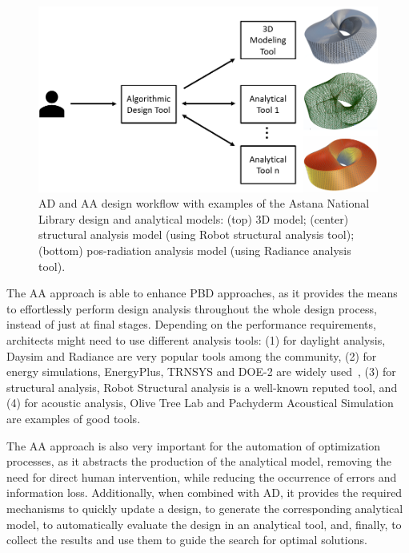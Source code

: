 \begin{figure}[htbp]
\centering
\includegraphics[width=1\textwidth]{./Images/Introduction/AlgorithmicDesignAndAnalysis_w_models2.png}
\caption[General view of the Algorithmic Design and Analysis approach]{\ac{AD} and \ac{AA} design workflow with examples of the Astana National Library design and analytical models: (top) 3D model; (center) structural analysis model (using Robot structural analysis tool); (bottom) pos-radiation analysis model (using Radiance analysis tool).}
\label{fig:algorithmicanalysis}
\end{figure}		
	
The \ac{AA} approach is able to enhance \ac{PBD} approaches, as it provides the means to effortlessly perform design analysis throughout the whole design process, instead of just at final stages. Depending on the performance requirements, architects might need to use different analysis tools: (1) for daylight analysis, Daysim and Radiance are very popular tools among the community, (2) for energy simulations, EnergyPlus, TRNSYS and DOE-2 are widely used~\cite{Nguyen2014}, (3) for structural analysis, Robot Structural analysis is a well-known reputed tool, and (4) for acoustic analysis, Olive Tree Lab and Pachyderm Acoustical Simulation are examples of good tools.%

The \ac{AA} approach is also very important for the automation of optimization processes, as it abstracts the production of the analytical model, removing the need for direct human intervention, while reducing the occurrence of errors and information loss. Additionally, when combined with \ac{AD}, it provides the required mechanisms to quickly update a design, to generate the corresponding analytical model, to automatically evaluate the design in an analytical tool, and, finally, to collect the results and use them to guide the search for optimal solutions. 

